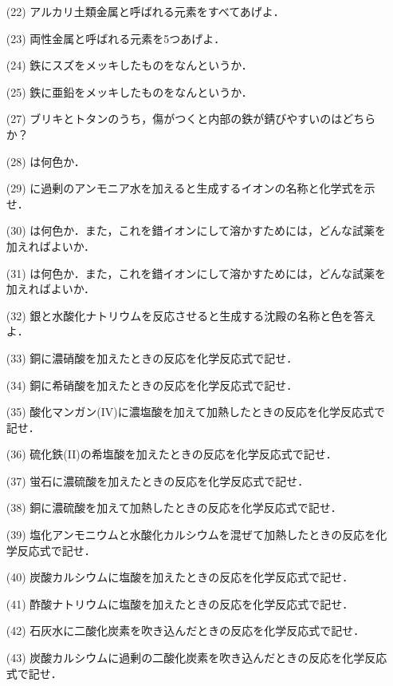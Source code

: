 \documentclass[a4paper,twocolumn,11pt]{ltjsarticle}
\begin{document}
\begin{itemize}
\item[(22)]アルカリ土類金属と呼ばれる元素をすべてあげよ．\\[2cm]
\item[(23)]両性金属と呼ばれる元素を5つあげよ．\\[2cm]
\item[(24)]鉄にスズをメッキしたものをなんというか．\\[2cm]
\item[(25)]鉄に亜鉛をメッキしたものをなんというか．\\  [2cm]
\item[(27)]ブリキとトタンのうち，傷がつくと内部の鉄が錆びやすいのはどちらか？\\[2cm]
\item[(28)]は何色か．\newpage
\item[(29)]  に過剰のアンモニア水を加えると生成するイオンの名称と化学式を示せ．\\[3cm]
\item[(30)]は何色か．また，これを錯イオンにして溶かすためには，どんな試薬を加えればよいか．\\[2cm]
\item[(31)]は何色か．また，これを錯イオンにして溶かすためには，どんな試薬を加えればよいか．\\[2cm]
\item[(32)]銀と水酸化ナトリウムを反応させると生成する沈殿の名称と色を答えよ．\\[2cm]
\item[(33)]銅に濃硝酸を加えたときの反応を化学反応式で記せ．\\[2cm]
\newpage 
\item[(34)]銅に希硝酸を加えたときの反応を化学反応式で記せ．\\[2cm]
\item[(35)]酸化マンガン(IV)に濃塩酸を加えて加熱したときの反応を化学反応式で記せ．\\[2cm]
\item[(36)]硫化鉄(II)の希塩酸を加えたときの反応を化学反応式で記せ．\\[2cm]
\item[(37)]蛍石に濃硫酸を加えたときの反応を化学反応式で記せ．\\[2cm]
\item[(38)]銅に濃硫酸を加えて加熱したときの反応を化学反応式で記せ．\\[2cm]
\newpage
\item[(39)] 塩化アンモニウムと水酸化カルシウムを混ぜて加熱したときの反応を化学反応式で記せ．\\[2cm]
\item[(40)]炭酸カルシウムに塩酸を加えたときの反応を化学反応式で記せ．\\[2cm]
\item[(41)]酢酸ナトリウムに塩酸を加えたときの反応を化学反応式で記せ．\\[2cm]       
 \item[(42)]石灰水に二酸化炭素を吹き込んだときの反応を化学反応式で記せ．\\[2cm]
 \item[(43)]炭酸カルシウムに過剰の二酸化炭素を吹き込んだときの反応を化学反応式で記せ．      
    \end{itemize}
\end{document}
